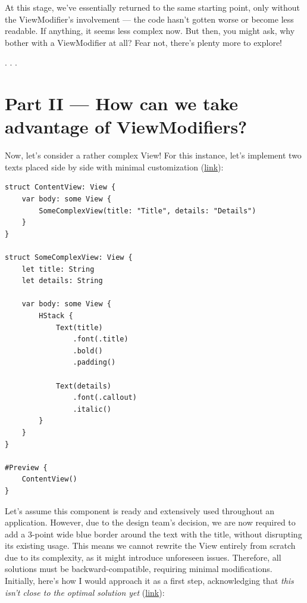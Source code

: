 \documentclass{article}
\newcommand{\separator}{\vspace{5mm}\centerline{. . .}\vspace{5mm}}
\begin{document}
At this stage, we’ve essentially returned to the same starting point, only without the ViewModifier's involvement — the code hasn’t gotten worse or become less readable. If anything, it seems less complex now. But then, you might ask, why bother with a ViewModifier at all?  Fear not, there’s plenty more to explore!

\separator

\section{Part II — How can we take advantage of ViewModifiers?}
\label{sec:part2}

Now, let’s consider a rather complex View! For this instance, let’s implement two texts placed side by side with minimal customization (\href{https://github.com/stateman92/Medium-ViewModifier/commit/65ea3634a623adbe5dfb987853908199d147bce1}{link}):

\begin{lstlisting}
struct ContentView: View {
    var body: some View {
        SomeComplexView(title: "Title", details: "Details")
    }
}

struct SomeComplexView: View {
    let title: String
    let details: String

    var body: some View {
        HStack {
            Text(title)
                .font(.title)
                .bold()
                .padding()

            Text(details)
                .font(.callout)
                .italic()
        }
    }
}

#Preview {
    ContentView()
}
\end{lstlisting}

Let’s assume this component is ready and extensively used throughout an application. However, due to the design team’s decision, we are now required to add a 3-point wide blue border around the text with the title, without disrupting its existing usage. This means we cannot rewrite the View entirely from scratch due to its complexity, as it might introduce unforeseen issues. Therefore, all solutions must be backward-compatible, requiring minimal modifications. Initially, here’s how I would approach it as a first step, acknowledging that \emph{this isn’t close to the optimal solution yet} (\href{https://github.com/stateman92/Medium-ViewModifier/commit/4912b7d6eb62f1fba72c002b9258444adc10672f}{link}):
\end{document}
